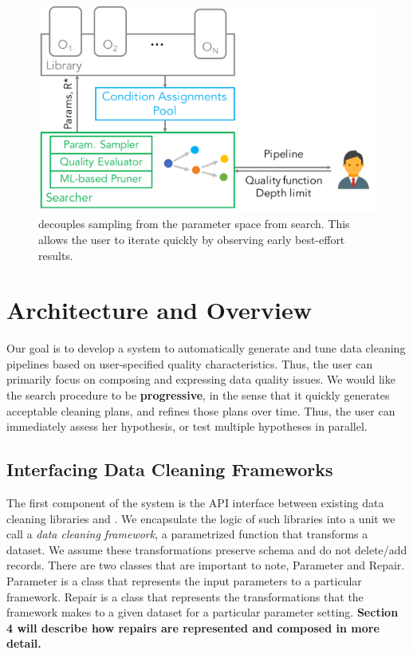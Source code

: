\begin{figure}[t]
\centering
 \includegraphics[width=0.7\columnwidth]{figures/arch}
 \caption{\small \sys decouples sampling from the parameter space from search. This allows the user to iterate quickly by observing early best-effort results. \label{fig:arch}}
\end{figure}


\section{Architecture and Overview}
Our goal is to develop a system to automatically generate and tune data cleaning pipelines based on user-specified quality characteristics.  Thus, the user can primarily focus on composing and expressing data quality issues.  We would like the search procedure to be \textbf{progressive}, in the sense that it quickly generates acceptable cleaning plans, and refines those plans over time.  Thus, the user can immediately assess her hypothesis, or test multiple hypotheses in parallel.

\subsection{Interfacing Data Cleaning Frameworks}
The first component of the system is the API interface between existing data cleaning libraries and \sys. We encapsulate the logic of such libraries into a unit we call a \emph{data cleaning framework}, a parametrized function that transforms a dataset. We assume these transformations preserve schema and do not delete/add records.
There are two classes that are important to note, \textsf{Parameter} and \textsf{Repair}.  \textsf{Parameter} is a class that represents the input parameters to a particular framework. \textsf{Repair} is a class that represents the transformations that the framework makes to a given dataset for a particular parameter setting.
\textbf{Section 4 will describe how repairs are represented and composed in more detail.}

